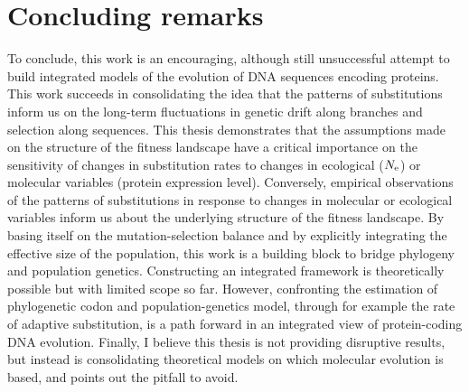 \section{Concluding remarks}
\label{sec:concluding-remarks}

To conclude, this work is an encouraging, although still unsuccessful attempt to build integrated models of the evolution of DNA sequences encoding proteins.
This work succeeds in consolidating the idea that the patterns of substitutions inform us on the long-term fluctuations in genetic drift along branches and selection along sequences.
This thesis demonstrates that the assumptions made on the structure of the fitness landscape have a critical importance on the sensitivity of changes in substitution rates to changes in ecological ($N_{\textrm{e}}$) or molecular variables (protein expression level).
Conversely, empirical observations of the patterns of substitutions in response to changes in molecular or ecological variables inform us about the underlying structure of the fitness landscape.
By basing itself on the mutation-selection balance and by explicitly integrating the effective size of the population, this work is a building block to bridge phylogeny and population genetics.
Constructing an integrated framework is theoretically possible but with limited scope so far.
However, confronting the estimation of phylogenetic codon and population-genetics model, through for example the rate of adaptive substitution, is a path forward in an integrated view of protein-coding DNA evolution.
Finally, I believe this thesis is not providing disruptive results, but instead is consolidating theoretical models on which molecular evolution is based, and points out the pitfall to avoid.
